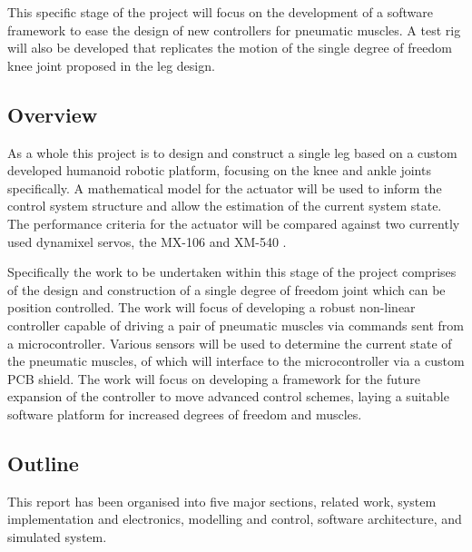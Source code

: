 \documentclass[11pt,a4paper]{article}
\begin{document}
This specific stage of the project will focus on the development of a software framework to ease the design of new controllers for pneumatic muscles. A test rig will also be developed that replicates the motion of the single degree of freedom knee joint proposed in the leg design.

\subsection{Overview}
\label{sub:overview}

As a whole this project is to design and construct a single leg based on a custom developed humanoid robotic platform, focusing on the knee and ankle joints specifically. A mathematical model for the actuator will be used to inform the control system structure and allow the estimation of the current system state. The performance criteria for the actuator will be compared against two currently used dynamixel servos, the MX-106 \cite{robotis_mx106} and XM-540 \cite{robotis}.

Specifically the work to be undertaken within this stage of the project comprises of the design and construction of a single degree of freedom joint which can be position controlled. The work will focus of developing a robust non-linear controller capable of driving a pair of pneumatic muscles via commands sent from a microcontroller. Various sensors will be used to determine the current state of the pneumatic muscles, of which will interface to the microcontroller via a custom PCB shield. The work will focus on developing a framework for the future expansion of the controller to move advanced control schemes, laying a suitable software platform for increased degrees of freedom and muscles.

\clearpage
\subsection{Outline}
\label{sub:outline}

This report has been organised into five major sections, related work, system implementation and electronics, modelling and control, software architecture, and simulated system.
\end{document}

